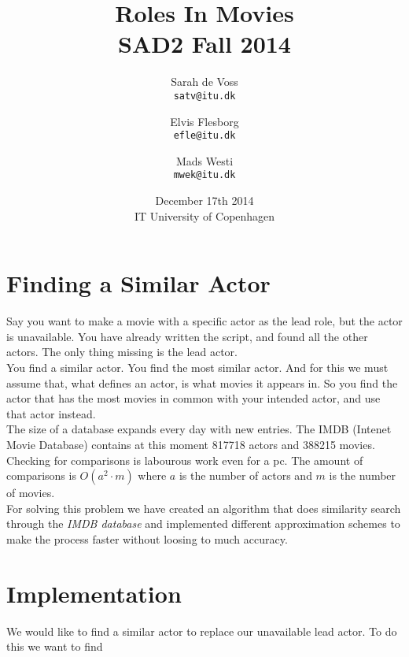 \documentclass[a4paper,11pt]{article}
\begin{document}
\setlength{\parindent}{0cm}
\setlength{\unitlength}{1mm}
\date{December 17th 2014\\ IT University of Copenhagen}
\title{Roles In Movies\\SAD2 Fall 2014}

\author{Sarah de Voss\\
\texttt{satv@itu.dk}
\and Elvis Flesborg\\
\texttt{efle@itu.dk}
\and Mads Westi\\
\texttt{mwek@itu.dk}}
\clearpage\maketitle

\thispagestyle{empty}
\newpage
\tableofcontents
\thispagestyle{empty}
\newpage

\setcounter{page}{1}
\section{Finding a Similar Actor}

Say you want to make a movie with a specific actor as the lead role, but the actor is unavailable. You have already written the script, and found all the other actors. The only thing missing is the lead actor. \\

You find a similar actor. You find the most similar actor. And for this we must assume that, what defines an actor, is what movies it appears in. So you find the actor that has the most movies in common with your intended actor, and use that actor instead. \\

The size of a database expands every day with new entries. The IMDB (Intenet Movie Database) contains at this moment 817718 actors and 388215 movies. Checking for comparisons is labourous work even for a pc. The amount of comparisons is $O(a^2\cdot m)$ where $a$ is the number of actors and $m$ is the number of movies.\\

For solving this problem we have created an algorithm that does similarity search through the \emph{IMDB database} and implemented different approximation schemes to make the process faster without loosing to much accuracy.


\section{Implementation}
\begin{mdframed}[hidealllines=true,backgroundcolor=blue!20]
We would like to find a similar actor to replace our unavailable lead actor. To do this we want to find 
\end{mdframed}
\end{document}
